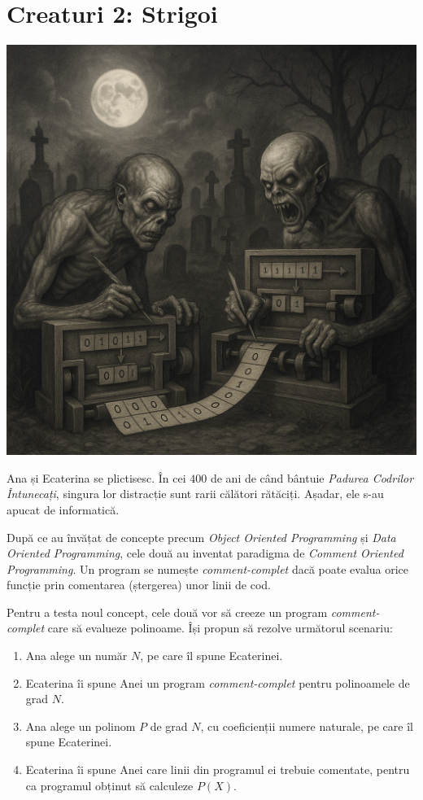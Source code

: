 \documentclass[12pt,a4paper]{article}
\begin{document}


\section*{Creaturi 2: Strigoi}


\begin{center}
\includegraphics[scale=0.15]{strigoi.png}
\end{center}

Ana și Ecaterina se plictisesc. În cei $400$ de ani de când bântuie \textit{Padurea Codrilor Întunecați}, singura lor distracție sunt rarii călători rătăciți. Așadar, ele s-au apucat de informatică. 

\vspace{1em}

După ce au învățat de concepte precum \textit{Object Oriented Programming} și \textit{Data Oriented Programming}, cele două au inventat paradigma de \textit{Comment Oriented Programming}. Un program se numește \textit{comment-complet} dacă poate evalua orice funcție prin comentarea (ștergerea) unor linii de cod.

Pentru a testa noul concept, cele două vor să creeze un program \textit{comment-complet} care să evalueze polinoame. Își propun să rezolve următorul scenariu:

\begin{enumerate}
    \item Ana alege un număr $N$, pe care îl spune Ecaterinei.
    \item Ecaterina îi spune Anei un program \textit{comment-complet} pentru polinoamele de grad $N$.
    \item Ana alege un polinom $P$ de grad $N$, cu coeficienții numere naturale, pe care îl spune Ecaterinei.
    \item Ecaterina îi spune Anei care linii din programul ei trebuie comentate, pentru ca programul obținut să calculeze $P(X)$.
\end{enumerate}
\end{document}

